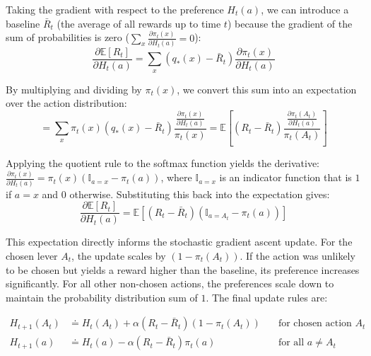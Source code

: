 \documentclass{article}
\begin{document}
Taking the gradient with respect to the preference $H_t(a)$, we can introduce a baseline $\bar{R}_t$ (the average of all rewards up to time $t$) because the gradient of the sum of probabilities is zero ($\sum_x \frac{\partial \pi_t(x)}{\partial H_t(a)} = 0$):
\begin{equation}
    \frac{\partial \mathbb{E}[R_t]}{\partial H_t(a)} = \sum_{x} (q_*(x) - \bar{R}_t) \frac{\partial \pi_t(x)}{\partial H_t(a)}
\end{equation}

By multiplying and dividing by $\pi_t(x)$, we convert this sum into an expectation over the action distribution:
\begin{equation}
    = \sum_{x} \pi_t(x) (q_*(x) - \bar{R}_t) \frac{\frac{\partial \pi_t(x)}{\partial H_t(a)}}{\pi_t(x)} = \mathbb{E} \left[ (R_t - \bar{R}_t) \frac{\frac{\partial \pi_t(A_t)}{\partial H_t(a)}}{\pi_t(A_t)} \right]
\end{equation}

Applying the quotient rule to the softmax function yields the derivative: $\frac{\partial \pi_t(x)}{\partial H_t(a)} = \pi_t(x)(\mathbb{I}_{a=x} - \pi_t(a))$, where $\mathbb{I}_{a=x}$ is an indicator function that is $1$ if $a=x$ and $0$ otherwise. Substituting this back into the expectation gives:
\begin{equation}
    \frac{\partial \mathbb{E}[R_t]}{\partial H_t(a)} = \mathbb{E} \left[ (R_t - \bar{R}_t) (\mathbb{I}_{a=A_t} - \pi_t(a)) \right]
\end{equation}

This expectation directly informs the stochastic gradient ascent update. For the chosen lever $A_t$, the update scales by $(1 - \pi_t(A_t))$. If the action was unlikely to be chosen but yields a reward higher than the baseline, its preference increases significantly. For all other non-chosen actions, the preferences scale down to maintain the probability distribution sum of $1$. The final update rules are:

\begin{align}
    H_{t+1}(A_t) &\doteq H_t(A_t) + \alpha (R_t - \bar{R}_t) (1 - \pi_t(A_t)) \quad &\text{for chosen action } A_t \\
    H_{t+1}(a) &\doteq H_t(a) - \alpha (R_t - \bar{R}_t) \pi_t(a) \quad &\text{for all } a \neq A_t
\end{align}
\end{document}

